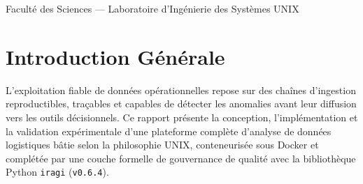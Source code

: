 \documentclass[11pt,a4paper]{article}
\renewcommand{\arraystretch}{1.24}
\begin{document}
\begin{titlepage}
\begin{center}
        \vspace{1.7cm}


        \vfill
        {\small\textcolor{unilublue}{Facult\'e des Sciences --- Laboratoire d'Ing\'enierie des Syst\`emes UNIX}}
        \vspace*{0.5cm}
    \end{center}
\end{titlepage}

\tableofcontents
\newpage

\section{Introduction G\'en\'erale}
L'exploitation fiable de donn\'ees op\'erationnelles repose sur des cha\^ines d'ingestion reproductibles, tra\c{c}ables et capables de d\'etecter les anomalies avant leur diffusion vers les outils d\'ecisionnels. Ce rapport pr\'esente la conception, l'impl\'ementation et la validation exp\'erimentale d'une plateforme compl\`ete d'analyse de donn\'ees logistiques b\^atie selon la philosophie UNIX, conteneuris\'ee sous Docker et compl\'et\'ee par une couche formelle de gouvernance de qualit\'e avec la biblioth\`eque Python \texttt{iragi} (\texttt{v0.6.4}).
\end{document}
